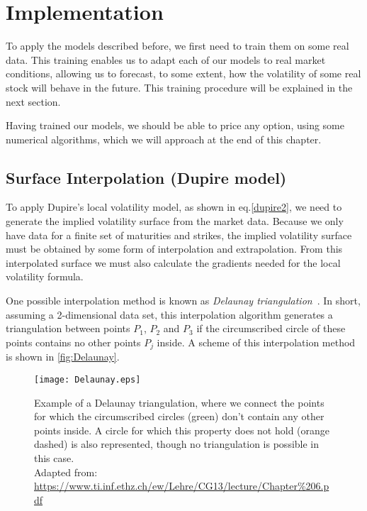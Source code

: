 \chapter{Implementation}
\label{chapter:implementation}
To apply the models described before, we first need to train them on some real data.
This training enables us to adapt each of our models to real market conditions, allowing us to forecast, to some extent, how the volatility of some real stock will behave in the future. This training procedure will be explained in the next section.

Having trained our models, we should be able to price any option, using some numerical algorithms, which we will approach at the end of this chapter.

\section{Surface Interpolation (Dupire model)}
\label{section:Surface Interpolation (Dupire)}
To apply Dupire's local volatility model, as shown in eq.\eqref{dupire2}, we need to generate the implied volatility surface from the market data. Because we only have data for a finite set of maturities and strikes, the implied volatility surface must be obtained by some form of interpolation and extrapolation. From this interpolated surface we must also calculate the gradients needed for the local volatility formula.

 
One possible interpolation method is known as \emph{Delaunay triangulation}~\citep{Isaac}. In short, assuming a 2-dimensional data set, this interpolation algorithm generates a triangulation between points $P_1$, $P_2$ and $P_3$ if the circumscribed circle of these points contains no other points $P_j$ inside. A scheme of this interpolation method is shown in \autoref{fig:Delaunay}.

\begin{figure}[!htb]
    \centering
      \texttt{[image: Delaunay.eps]}
      \caption[Example of a Delaunay triangulation, where we connect the points for which the circumscribed circles don't contain any other points inside. A circle for which this property does not hold is also represented, though no triangulation is possible in this case.]{Example of a Delaunay triangulation, where we connect the points for which the circumscribed circles (green) don't contain any other points inside. A circle for which this property does not hold (orange dashed) is also represented, though no triangulation is possible in this case.\\{\small Adapted from: \url{https://www.ti.inf.ethz.ch/ew/Lehre/CG13/lecture/Chapter\%206.pdf}}}\label{fig:Delaunay}
    \end{figure}

